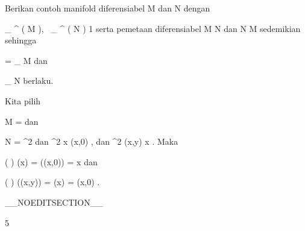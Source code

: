 {

Berikan contoh manifold diferensiabel
\mathkor {} {M} {dan} {N} {}
dengan

\mavergleichskette
{\vergleichskette
{ _{  } ^{  }  \left(   M   \right), \, _{  } ^{  }  \left(   N   \right)
}
{ \geq }{ 1
}
{  }{
}
{    }{
}
{   }{
}
}
{}{}{}
serta pemetaan diferensiabel
\maabb {\varphi} { M } { N
} {}
dan
\maabb {\psi} { N } { M
} {}
sedemikian sehingga

\mavergleichskette
{\vergleichskette
{ \psi \circ \varphi
}
{ = }{
_{ M }
}
{  }{
}
{    }{
}
{   }{
}
}
{}{}{}
dan

\mavergleichskette
{\vergleichskette
{\varphi \circ  \psi
}
{ \neq }{
_{ N }
}
{  }{
}
{    }{
}
{   }{
}
}
{}{}{}
berlaku.

}
{

Kita pilih

\mavergleichskette
{\vergleichskette
{M
}
{ = }{\R
}
{ }{
}
{ }{
}
{ }{
}
}
{}{}{}
dan

\mavergleichskette
{\vergleichskette
{N
}
{ = }{\R^2
}
{ }{
}
{ }{
}
{ }{
}
}
{}{}{}
dan
\maabbeledisp {\varphi} {\R} {\R^2
} { x } {(x,0)
} {,}
dan
\maabbeledisp {\psi} {\R^2} {\R
} {(x,y)} { x
} {.}
Maka

\mavergleichskettedisp
{\vergleichskette
{ \left( \psi \circ \varphi \right) (x)
}
{ =} { \psi((x,0))
}
{ =} { x
}
{ } {
}
{ } {
}
}
{}{}{}
dan

\mavergleichskettedisp
{\vergleichskette
{ \left(  \varphi  \circ \psi  \right) ((x,y))
}
{ =} { \varphi (x)
}
{ =} {(x,0)
}
{ } {
}
{ } {
}
}
{}{}{.}

 }

__NOEDITSECTION__

{5}

